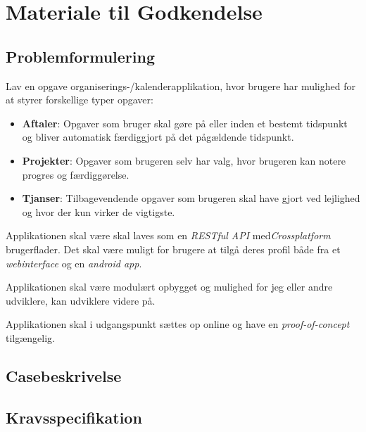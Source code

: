 \documentclass{report}
\begin{document}
\maketitle
\makeTechTitlecard
\tableofcontents

\chapter{Materiale til Godkendelse}

\section{Problemformulering}
\label{probform}

Lav en opgave organiserings-/kalenderapplikation, hvor brugere har mulighed for at styrer forskellige typer opgaver:
\begin{itemize}
\item \textbf{Aftaler}: Opgaver som bruger skal gøre på eller inden et bestemt tidspunkt og bliver automatisk færdiggjort på det pågældende tidspunkt.
\item \textbf{Projekter}: Opgaver som brugeren selv har valg, hvor brugeren kan notere progres og færdiggørelse. 
\item \textbf{Tjanser}: Tilbagevendende opgaver som brugeren skal have gjort ved lejlighed og hvor der kun virker de vigtigste.
\end{itemize}

Applikationen skal være skal laves som en \textit{RESTful API} med\textit{Crossplatform} brugerflader. Det skal være muligt for brugere at tilgå deres profil både fra et \textit{webinterface} og en \textit{android app}.\par{}

Applikationen skal være modulært opbygget og mulighed for jeg eller andre udviklere, kan udviklere videre på.\par{}

Applikationen skal i udgangspunkt sættes op online og have en \textit{proof-of-concept} tilgængelig.

\section{Casebeskrivelse}
\label{case}



\section{Kravsspecifikation}
\label{kravspec}
\end{document}
